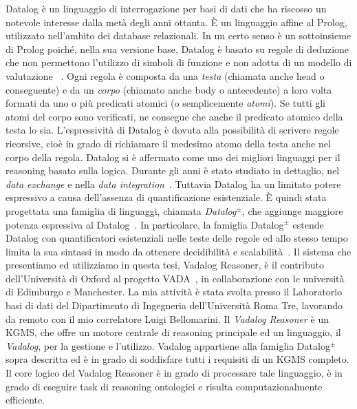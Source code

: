 Datalog è un linguaggio di interrogazione per basi di dati che ha riscosso un notevole interesse dalla metà degli anni ottanta. È un linguaggio affine al Prolog, utilizzato nell'ambito dei database relazionali. In un certo senso è un sottoinsieme di Prolog poiché, nella sua versione base, Datalog è basato su regole di deduzione che non permettono l'utilizzo di simboli di funzione e non adotta di un modello di valutazione~\cite{atzeni2006basi} . \newline
Ogni regola è composta da una \emph{testa} (chiamata anche head o conseguente) e da un \emph{corpo} (chiamato anche body o antecedente) a loro volta formati da uno o più predicati atomici (o semplicemente \emph{atomi}). Se tutti gli atomi del corpo sono verificati, ne consegue che anche il predicato atomico della testa lo sia. L'espressività di Datalog è dovuta alla possibilità di scrivere regole ricorsive, cioè in grado di richiamare il medesimo atomo della testa anche nel corpo della regola. \newline
Datalog si è affermato come uno dei migliori linguaggi per il reasoning basato sulla logica. Durante gli anni è stato studiato in dettaglio, nel \emph{data exchange} e nella \emph{data integration}~\cite{furche2016data}. Tuttavia Datalog ha un limitato potere espressivo a causa dell'assenza di quantificazione esistenziale. È quindi stata progettata una famiglia di linguaggi, chiamata \emph{Datalog$^\pm$}, che aggiunge maggiore potenza espressiva al Datalog~\cite{bellomarini2017swift}. \newline 
In particolare, la famiglia Datalog$^\pm$ estende Datalog con quantificatori esistenziali nelle teste delle regole ed allo stesso tempo limita la sua sintassi in modo da ottenere decidibilità e scalabilità~\cite{cali2013taming,cali2012towards,cali2010datalog+}.  \newline \newline
Il sistema che presentiamo ed utilizziamo in questa tesi, Vadalog Reasoner, è il contributo dell'Università di Oxford al progetto VADA~\cite{VADA}, in collaborazione con le università di Edimburgo e Manchester. La mia attività è stata svolta presso il Laboratorio basi di dati del Dipartimento di Ingegneria dell'Università Roma Tre, lavorando da remoto con il mio correlatore Luigi Bellomarini. \newline
Il \emph{Vadalog Reasoner} è un KGMS, che offre un motore centrale di reasoning principale ed un linguaggio, il \emph{Vadalog}, per la gestione e l'utilizzo. Vadalog appartiene alla famiglia Datalog$^\pm$ sopra descritta ed è in grado di soddisfare tutti i requisiti di un KGMS completo. Il core logico del Vadalog Reasoner è in grado di processare tale linguaggio, è in grado di eseguire task di reasoning ontologici e risulta computazionalmente efficiente. \newline
